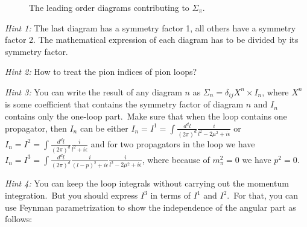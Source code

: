 \documentclass[11pt]{latex/exercise}
\begin{document}
\begin{itemize}
\begin{figure}[h]
\begin{subfigure}{0.17 \textwidth}
                  \caption{}
              \end{subfigure}
              \begin{subfigure}{0.27 \textwidth}
                  \centering
                  \caption{}
              \end{subfigure}
              \caption{The leading order diagrams contributing to $\Sigma_{\pi}$.}
              \label{fig:SigmaPi}
          \end{figure}
          \emph{Hint 1:} The last diagram has a symmetry factor 1, all others have a symmetry factor 2. The mathematical expression of each diagram has to be divided by its symmetry factor.

          \emph{Hint 2:} How to treat the pion indices of pion loops?


          \emph{Hint 3:} You can write the result of any diagram $n$ as $\Sigma_n = \delta_{i j} X^n \times I_n$, where $X^n$ is some coefficient that contains the symmetry factor of diagram $n$ and $I_n$ contains only the one-loop part.~Make sure that when the loop contains one propagator, then $I_n$ can be either $ I_n  = I^1 = \int \frac{d^d l }{(2\pi)^d } \frac{i}{l^2 - 2 \mu^2 + i \epsilon }$ or $I_n = I^2  = \int \frac{d^d l }{(2\pi)^d} \frac{i}{l^2  + i \epsilon }$ and  for two propagators in the loop we have $I_n = I^3 = \int \frac{d^d l }{(2\pi)^d } \frac{i}{(l-p)^2 + i \epsilon } \frac{i}{l^2 - 2 \mu^2 + i \epsilon}$, where because of $m_\pi^2 = 0$ we have $p^2 = 0$.

          \emph{Hint 4:} You can keep the loop integrals without carrying out the momentum integration.~But you should express $I^3$ in terms of $I^1$ and $I^2$.~For that, you can use Feynman parametrization to show the independence of the angular part as follows:


\end{itemize}
\end{document}
